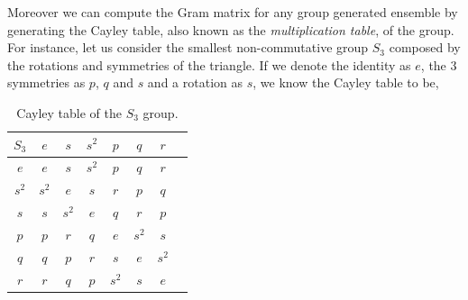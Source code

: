 \documentclass[12pt,letterpaper]{article}
\begin{document}
\begin{multicols}{2}
Moreover we can compute the Gram matrix for any group generated ensemble by generating the Cayley table\cite{CayleyTable}, also known as the \emph{multiplication table}, of the group. For instance, let us consider the smallest non-commutative group $S_3$ composed by the rotations and symmetries of the triangle. If we denote the identity as $e$, the 3 symmetries as $p$, $q$ and $s$ and a rotation as $s$, we know the Cayley table to be,
\begin{table}[H]
	\centering
	\caption{Cayley table of the $S_3$ group.}
	\begin{tabular}{c||c c c c c c c}
        $S_3$ & $e$ & $s$ & $s^2$ & $p$ & $q$ & $r$ \\\hline\hline
        $e$   & $e$ & $s$ & $s^2$ & $p$ & $q$ & $r$ \\
        $s^2$ & $s^2$ & $e$ & $s$ & $r$ & $p$ & $q$ \\
        $s$   & $s$ & $s^2$ & $e$ & $q$ & $r$ & $p$ \\
        $p$ & $p$ & $r$ & $q$ & $e$ & $s^2$ & $s$ \\
        $q$ & $q$ & $p$ & $r$ & $s$ & $e$ & $s^2$ \\
        $r$ & $r$ & $q$ & $p$ & $s^2$ & $s$ & $e$
    \end{tabular}
\end{table}


\end{multicols}
\end{document}
